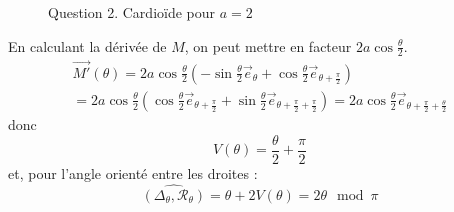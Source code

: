 \begin{enumerate}
\begin{figure}
   \caption{Question 2. Cardioïde pour $a=2$}
   \label{fig:Ccaustic_1}
\end{figure}
En calculant la dérivée de $M$, on peut mettre en facteur $2a\cos \frac{\theta}{2}$.
\begin{multline*}
\overrightarrow{M'}(\theta)
= 2a\cos \frac{\theta}{2}\left(-\sin \frac{\theta}{2} \overrightarrow{e}_{\theta}+\cos \frac{\theta}{2}\overrightarrow{e}_{\theta +\frac{\pi}{2}} \right)\\
= 2a\cos \frac{\theta}{2}
\left(
\cos \frac{\theta}{2}\overrightarrow{e}_{\theta +\frac{\pi}{2}} +
\sin \frac{\theta}{2} \overrightarrow{e}_{\theta+\frac{\pi}{2}+\frac{\pi}{2}}
 \right)
= 2a\cos \frac{\theta}{2} \overrightarrow{e}_{\theta +\frac{\pi}{2}+\frac{\theta}{2}}
\end{multline*}
donc 
\begin{displaymath}
V(\theta) = \frac{\theta}{2}+\frac{\pi}{2} 
\end{displaymath}
et, pour l'angle orienté entre les droites :
\begin{displaymath}
 \widehat{(\Delta_\theta,\mathcal{R}_\theta)} = \theta + 2V(\theta) = 2\theta \mod \pi
\end{displaymath}


\end{enumerate}
